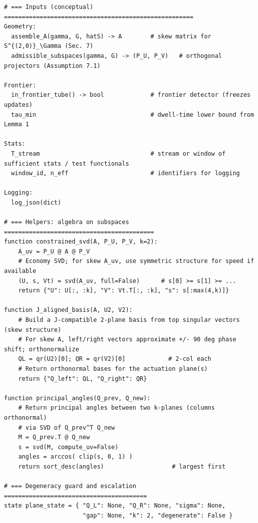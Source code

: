 \begin{lstlisting}
# === Inputs (conceptual) =====================================================
Geometry:
  assemble_A(gamma, G, hatS) -> A        # skew matrix for S^{(2,0)}_\Gamma (Sec. 7)
  admissible_subspaces(gamma, G) -> (P_U, P_V)   # orthogonal projectors (Assumption 7.1)

Frontier:
  in_frontier_tube() -> bool             # frontier detector (freezes updates)
  tau_min                                # dwell-time lower bound from Lemma 1

Stats:
  T_stream                               # stream or window of sufficient stats / test functionals
  window_id, n_eff                       # identifiers for logging

Logging:
  log_json(dict)

# === Helpers: algebra on subspaces ==========================================
function constrained_svd(A, P_U, P_V, k=2):
    A_uv = P_U @ A @ P_V
    # Economy SVD; for skew A_uv, use symmetric structure for speed if available
    (U, s, Vt) = svd(A_uv, full=False)      # s[0] >= s[1] >= ...
    return {"U": U[:, :k], "V": Vt.T[:, :k], "s": s[:max(4,k)]}

function J_aligned_basis(A, U2, V2):
    # Build a J-compatible 2-plane basis from top singular vectors (skew structure)
    # For skew A, left/right vectors approximate +/- 90 deg phase shift; orthonormalize
    QL = qr(U2)[0]; QR = qr(V2)[0]            # 2-col each
    # Return orthonormal bases for the actuation plane(s)
    return {"Q_left": QL, "Q_right": QR}

function principal_angles(Q_prev, Q_new):
    # Return principal angles between two k-planes (columns orthonormal)
    # via SVD of Q_prev^T Q_new
    M = Q_prev.T @ Q_new
    s = svd(M, compute_uv=False)
    angles = arccos( clip(s, 0, 1) )
    return sort_desc(angles)                   # largest first

# === Degeneracy guard and escalation ========================================
state plane_state = { "Q_L": None, "Q_R": None, "sigma": None,
                      "gap": None, "k": 2, "degenerate": False }


\end{lstlisting}
